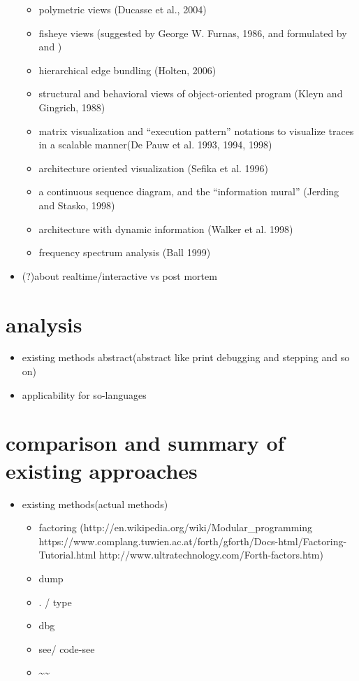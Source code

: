 \begin{itemize}
\begin{itemize}
	\item polymetric views (Ducasse et al., 2004)
	\item fisheye views (suggested by George W. Furnas, 1986, and formulated by \cite{Storey:1995:GLA:647547.728600} and \cite{Sarkar:1994:GFV:198366.198384})
	\item hierarchical edge bundling (Holten, 2006)
	\item structural and behavioral views of object-oriented program (Kleyn and Gingrich, 1988)
	\item matrix visualization and “execution pattern” notations \cite{Pauw98executionpatterns} to visualize traces in a scalable manner(De Pauw et al. 1993, 1994, 1998) 
	\item architecture oriented visualization (Sefika et al. 1996)
	\item a continuous sequence diagram, and the “information mural” (Jerding and Stasko, 1998)
	\item architecture with dynamic information (Walker et al. 1998)
	\item frequency spectrum analysis (Ball 1999)
	\end{itemize}
\item (?)about realtime/interactive vs post mortem
\end{itemize}

\section{analysis}

\begin{itemize}
\item existing methods abstract(abstract like print debugging and stepping and so on)
\item applicability for so-languages
\end{itemize}

\section{comparison and summary of existing approaches}

\begin{itemize}
\item existing methods(actual methods)
	\begin{itemize}
	\item factoring (http://en.wikipedia.org/wiki/Modular\_programming https://www.complang.tuwien.ac.at/forth/gforth/Docs-html/Factoring-Tutorial.html http://www.ultratechnology.com/Forth-factors.htm)
	\item dump
	\item . / type
	\item dbg
	\item see/ code-see
	\item \textasciitilde\textasciitilde
	\end{itemize}
\end{itemize}